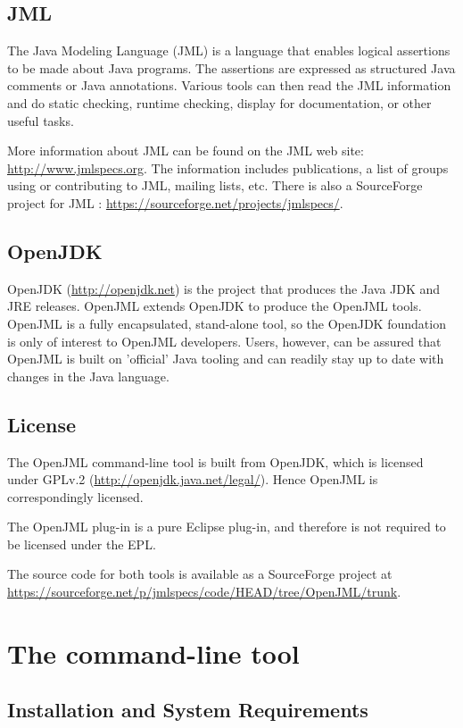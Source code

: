 \documentclass{report}%
\begin{document}
\section{JML}

The Java Modeling Language (JML) is a language that enables logical assertions
to be made about Java programs. The assertions are expressed as structured 
Java comments or Java annotations. Various tools can then read the JML 
information and do static checking, runtime checking, display for documentation,
or other useful tasks.

More information about JML can be found on the JML web site: 
\url{http://www.jmlspecs.org}.
The information includes publications, a list of groups using or contributing to JML, 
mailing lists, etc.
There is also a SourceForge project for JML : \url{https://sourceforge.net/projects/jmlspecs/}.

\section{OpenJDK}

OpenJDK (\url{http://openjdk.net}) is the project that produces the Java JDK and JRE releases.
OpenJML extends OpenJDK to produce the OpenJML tools. OpenJML is a 
fully encapsulated, stand-alone tool, so the OpenJDK foundation is only of interest to OpenJML developers.
Users, however, can be assured that OpenJML is built on 'official' Java tooling and can readily stay up 
to date with changes in the Java language.

\section{License}

The OpenJML command-line tool is built from OpenJDK, which is licensed under GPLv.2 (\url{http://openjdk.java.net/legal/}).
Hence OpenJML is correspondingly licensed.

The OpenJML plug-in is a pure Eclipse plug-in, and therefore is not required to be licensed under the EPL.


The source code for both tools is available as a SourceForge project at
\url{https://sourceforge.net/p/jmlspecs/code/HEAD/tree/OpenJML/trunk}.


\chapter{The command-line tool}
\label{CommandLineTool}
\section{Installation and System Requirements}
\end{document}
